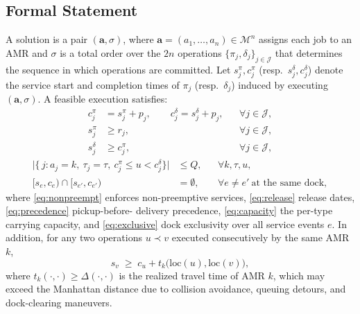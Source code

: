 \subsection{Formal Statement}

A solution is a pair $(\bm{a},\sigma)$, where
$\bm{a}=(a_1,\dots,a_n)\in\mathcal{M}^{n}$ assigns each job to an AMR
and $\sigma$ is a total order over the $2n$ operations
$\{\pi_j,\delta_j\}_{j\in\mathcal{J}}$ that determines the sequence in
which operations are committed. Let $s^{\pi}_j,c^{\pi}_j$
(resp.\ $s^{\delta}_j,c^{\delta}_j$) denote the service start and
completion times of $\pi_j$ (resp.\ $\delta_j$) induced by executing
$(\bm{a},\sigma)$. A feasible execution satisfies:
\begin{align}
c^{\pi}_j &= s^{\pi}_j + p_j, \qquad
c^{\delta}_j = s^{\delta}_j + p_j,
&& \forall j\in\mathcal{J}, \label{eq:nonpreempt}\\
s^{\pi}_j &\ge r_j,
&& \forall j\in\mathcal{J}, \label{eq:release}\\
s^{\delta}_j &\ge c^{\pi}_j,
&& \forall j\in\mathcal{J}, \label{eq:precedence}
\end{align}
\begin{align}
\big|\{\,j : a_j{=}k,\ \tau_j{=}\tau,\ c^{\pi}_j \le u < c^{\delta}_j \}\big| &\le Q,
&& \forall k,\tau,u, \label{eq:capacity}\\
\big[s_e, c_e\big) \cap \big[s_{e'}, c_{e'}\big) &= \emptyset,
&& \forall e\ne e' \ \text{at the same dock}, \label{eq:exclusive}
\end{align}
where \eqref{eq:nonpreempt} enforces non-preemptive services,
\eqref{eq:release} release dates, \eqref{eq:precedence} pickup-before-%
delivery precedence, \eqref{eq:capacity} the per-type carrying capacity,
and \eqref{eq:exclusive} dock exclusivity over all service events $e$.
In addition, for any two operations $u\prec v$ executed consecutively by
the same AMR $k$,
\begin{equation}
s_v \;\ge\; c_u + t_k\big(\mathrm{loc}(u),\mathrm{loc}(v)\big),
\label{eq:travel}
\end{equation}
where $t_k(\cdot,\cdot)\ge\Delta(\cdot,\cdot)$ is the realized travel
time of AMR $k$, which may exceed the Manhattan distance due to
collision avoidance, queuing detours, and dock-clearing maneuvers.

